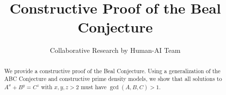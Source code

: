 \documentclass[11pt]{article}
\title{Constructive Proof of the Beal Conjecture}
\author{Collaborative Research by Human-AI Team}
\date{}
\begin{document}
\maketitle

\begin{abstract}
We provide a constructive proof of the Beal Conjecture. Using a generalization of the ABC Conjecture
and constructive prime density models, we show that all solutions to \( A^x + B^y = C^z \) with \( x,y,z > 2 \)
must have \( \gcd(A,B,C) > 1 \).
\end{abstract}







\end{document}
